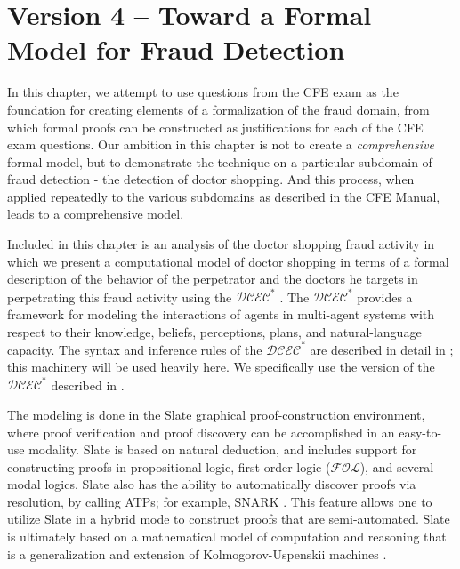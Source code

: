  
\chapter{Version 4 -- Toward a Formal Model for Fraud Detection}


In this chapter, we attempt to use questions from the CFE exam as the foundation for creating elements of a formalization of the fraud domain, from which formal proofs can be constructed as justifications for each of the CFE exam questions.  Our ambition in this chapter is not to create a \emph{comprehensive} formal model, but to demonstrate the technique on a particular subdomain of fraud detection - the detection of doctor shopping.  And this process, when applied repeatedly to the various subdomains as described in the CFE Manual, leads to a comprehensive model.

Included in this chapter is an analysis of the doctor shopping fraud activity in which we present a computational model of doctor shopping in terms of a formal description of the behavior of the perpetrator and the doctors he targets in perpetrating this fraud activity using the $\mathcal{DCEC}^\ast$ \cite{mgmmm_ptai_sb,ka_sb_scc_seqcalc}.  The $\mathcal{DCEC}^\ast$ provides a framework for modeling the interactions of agents in multi-agent systems with respect to their knowledge, beliefs, perceptions, plans, and natural-language capacity.  The syntax and inference rules of the $\mathcal{DCEC}^\ast$ are described in detail in \cite{mgmmm_ptai_sb,ka_sb_scc_seqcalc}; this machinery will be used heavily here.  We specifically use the version of the $\mathcal{DCEC}^\ast$ described in \cite{ka_sb_scc_seqcalc}.

The modeling is done in the Slate \cite{Slate_at_CMNA08} graphical proof-construction environment, where proof verification and proof discovery can be accomplished in an easy-to-use modality.  Slate is based on natural deduction, and includes support for constructing proofs in propositional logic, first-order logic ($\mathcal{FOL}$), and several modal logics.  Slate also has the ability to automatically discover proofs via resolution, by calling ATPs; for example, SNARK \cite{snarksri}.  This feature allows one to utilize Slate in a hybrid mode to construct proofs that are semi-automated.  Slate is ultimately based on a mathematical model of computation and reasoning that is a generalization and extension of Kolmogorov-Uspenskii machines \cite{kolmogorov1958definition,bringsjord_sundar_g_unprov_ct}.


